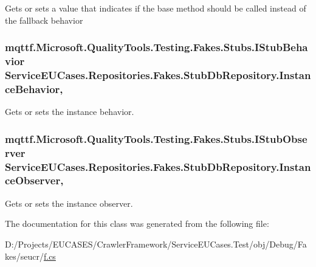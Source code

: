 Gets or sets a value that indicates if the base method should be called instead of the fallback behavior

\hypertarget{class_service_e_u_cases_1_1_repositories_1_1_fakes_1_1_stub_db_repository_af34d9ff5badb05a2f73a47997ec5921e}{
\subsubsection[{Instance\-Behavior}]{\setlength{\rightskip}{0pt plus 5cm}mqttf.\-Microsoft.\-Quality\-Tools.\-Testing.\-Fakes.\-Stubs.\-I\-Stub\-Behavior Service\-E\-U\-Cases.\-Repositories.\-Fakes.\-Stub\-Db\-Repository.\-Instance\-Behavior\hspace{0.3cm}{\ttfamily [get]}, {\ttfamily [set]}}}\label{class_service_e_u_cases_1_1_repositories_1_1_fakes_1_1_stub_db_repository_af34d9ff5badb05a2f73a47997ec5921e}


Gets or sets the instance behavior.

\hypertarget{class_service_e_u_cases_1_1_repositories_1_1_fakes_1_1_stub_db_repository_ac45d38dfea0e4e64ae3b1ac7a4a077ca}{
\subsubsection[{Instance\-Observer}]{\setlength{\rightskip}{0pt plus 5cm}mqttf.\-Microsoft.\-Quality\-Tools.\-Testing.\-Fakes.\-Stubs.\-I\-Stub\-Observer Service\-E\-U\-Cases.\-Repositories.\-Fakes.\-Stub\-Db\-Repository.\-Instance\-Observer\hspace{0.3cm}{\ttfamily [get]}, {\ttfamily [set]}}}\label{class_service_e_u_cases_1_1_repositories_1_1_fakes_1_1_stub_db_repository_ac45d38dfea0e4e64ae3b1ac7a4a077ca}


Gets or sets the instance observer.



The documentation for this class was generated from the following file\-:\begin{DoxyCompactItemize}
\item 
D\-:/\-Projects/\-E\-U\-C\-A\-S\-E\-S/\-Crawler\-Framework/\-Service\-E\-U\-Cases.\-Test/obj/\-Debug/\-Fakes/seucr/\hyperlink{seucr_2f_8cs}{f.\-cs}\end{DoxyCompactItemize}
